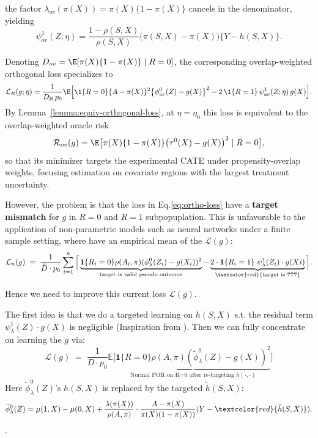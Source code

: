 \documentclass{article} %
\theoremstyle{plain} %
\theoremstyle{definition} %
\theoremstyle{remark} %
\begin{document}
the factor $\lambda_{ov}(\pi(X))=\pi(X)\{1-\pi(X)\}$ cancels in the denominator, yielding
\begin{equation}
    \psi^1_{ov}(Z;\eta)
  = \frac{1-\rho(S,X)}{\rho(S,X)}
    \bigl(\pi(S,X)-\pi(X)\bigr)\{Y-h(S,X)\}.
\end{equation}

Denoting $D_{ov}=\E[\pi(X)\{1-\pi(X)\}\mid R=0]$, the corresponding overlap-weighted orthogonal loss specializes to
\[
\mathcal{L}_{R}(g;\eta)
  = \frac{1}{D_{\mathrm{R}}\,p_0}\E\Big[
      \1\{R=0\}\{A-\pi(X)\}^2\big\{\phi^0_{ov}(Z)-g(X)\big\}^2
      - 2\,\1\{R=1\}\,\psi^1_{ov}(Z;\eta)\,g(X)
    \Big].
\]
By Lemma~\ref{lemma:equiv-orthogonal-loss}, at $\eta=\eta_0$ this loss is equivalent to the overlap-weighted oracle risk
\[
\mathcal{R}_{ov}(g)
  = \E\bigl[\pi(X)\{1-\pi(X)\}\bigl(\tau^0(X)-g(X)\bigr)^2\mid R=0\bigr],
\]
so that its minimizer targets the experimental CATE under propensity-overlap weights, focusing estimation on covariate regions with the largest treatment uncertainty.





However, the problem is that the loss in Eq.\ref{eq:ortho-loss} have a \textbf{target mismatch} for $g$ in $R=0$ and $R=1$ subpopuplation. This is unfavorable to the application of non-parametric models such as neural networks under a finite sample setting, where have an empirical mean of the $\mathcal{L}(g)$:
\begin{equation}
    \label{eq:ortho-loss}
    \mathcal{L}_n(g) \;=\;\frac{1}{\hat{D}\cdot p_0}\sum_{i=1}^n\Big[\underbrace{\mathbf{1}\{R_i=0\}\rho(A_i,\pi)(\phi_\lambda^0(Z_i)-g(X_i))^2}_{\text{target is valid pseudo outcome}} - \underbrace{2\cdot\mathbf{1}\{R_i=1\}\;\psi_\lambda^1(Z_i) \cdot g(Xi)}_{\textcolor{red}{\text{target is \textbf{???}}}}\Big].
\end{equation}

Hence we need to improve this current loss $\mathcal{L}(g)$.

The first idea is that we do a targeted learning on $h(S,X)$ s.t. the residual term $\psi_\lambda^1(Z) \cdot g(X)$ is negligible (Inspiration from \citet{Vansteelandt.2023}). Then we can fully concentrate on learning the $g$ via:
\begin{equation}
    \label{eq:targeted-loss}
    \mathcal{L}(g) \;=\;\frac{1}{D\cdot p_0}\mathbb{E}\Big[\underbrace{\mathbf{1}\{R=0\}\rho(A,\pi)(\widetilde{\phi}_\lambda^0(Z)-g(X))^2}_{\text{Normal POR on R=0 after re-targeting $h(\cdot,\cdot)$}} \Big]
\end{equation}
Here $\widetilde{\phi}^0_\lambda(Z)$'s $h(S,X)$ is replaced by the targeted $\widetilde{h}(S,X)$:
\begin{equation}
    \widetilde{\phi}^0_\lambda(Z)=\mu(1,X)-\mu(0,X)+\frac{\lambda(\pi(X))}{\rho(A,\pi)}\cdot \frac{A-\pi(X)}{\pi(X)(1-\pi(X))}(Y - \textcolor{red}{\widetilde{h}(S,X)}).
\end{equation}.
\end{document}
